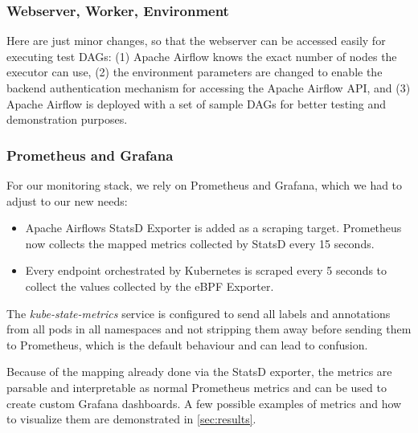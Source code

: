 \documentclass[a4paper,journal]{IEEEtran}
\begin{document}
\subsubsection{Webserver, Worker, Environment}
Here are just minor changes, so that the webserver can be accessed easily for executing test DAGs: (1) Apache Airflow knows the exact number of nodes the executor can use, (2) the environment parameters are changed to enable the backend authentication mechanism for accessing the Apache Airflow API, and (3) Apache Airflow is deployed with a set of sample DAGs for better testing and demonstration purposes. 

\subsubsection{Prometheus and Grafana}
For our monitoring stack, we rely on Prometheus and Grafana, which we had to adjust to our new needs:

\begin{itemize}
    \item Apache Airflows StatsD Exporter is added as a scraping target. Prometheus now collects the mapped metrics collected by StatsD every 15 seconds.
    \item Every endpoint orchestrated by Kubernetes is scraped every 5 seconds to collect the values collected by the eBPF Exporter.
\end{itemize}

The \textit{kube-state-metrics} service is configured to send all labels and annotations from all pods in all namespaces and not stripping them away before sending them to Prometheus, which is the default behaviour and can lead to confusion.

Because of the mapping already done via the StatsD exporter, the metrics are parsable and interpretable as normal Prometheus metrics and can be used to create custom Grafana dashboards. A few possible examples of metrics and how to visualize them are demonstrated in \autoref{sec:results}.
\end{document}
